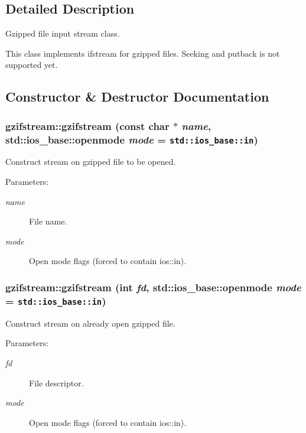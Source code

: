 \subsection{Detailed Description}
Gzipped file input stream class. 

This class implements ifstream for gzipped files. Seeking and putback is not supported yet. 



\subsection{Constructor \& Destructor Documentation}
\subsubsection{\setlength{\rightskip}{0pt plus 5cm}gzifstream::gzifstream (const char $\ast$ {\em name}, std::ios\_\-base::openmode {\em mode} = {\tt std::ios\_\-base::in})\hspace{0.3cm}{\tt  [explicit]}}\label{classgzifstream_fe98c53d46416860c4dd09df2825ced6}


Construct stream on gzipped file to be opened. 

\begin{Desc}
\item[Parameters:]
\begin{description}
\item[{\em name}]File name. \item[{\em mode}]Open mode flags (forced to contain ios::in). \end{description}
\end{Desc}
\subsubsection{\setlength{\rightskip}{0pt plus 5cm}gzifstream::gzifstream (int {\em fd}, std::ios\_\-base::openmode {\em mode} = {\tt std::ios\_\-base::in})\hspace{0.3cm}{\tt  [explicit]}}\label{classgzifstream_5ec2ceb848428f2943d9e54f8e18218c}


Construct stream on already open gzipped file. 

\begin{Desc}
\item[Parameters:]
\begin{description}
\item[{\em fd}]File descriptor. \item[{\em mode}]Open mode flags (forced to contain ios::in). \end{description}
\end{Desc}


